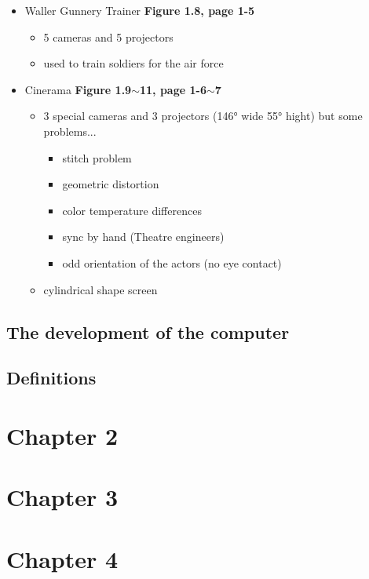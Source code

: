 \documentclass[12pt]{article}
\begin{document}
\begin{itemize}
\begin{itemize}
		\end{itemize}
	\item Waller Gunnery Trainer  \textbf{Figure 1.8, page 1-5}
		\begin{itemize}
			\item 5 cameras and 5 projectors
			\item used to train soldiers for the air force
		\end{itemize}
	\item Cinerama \textbf{Figure 1.9$\sim$11, page 1-6$\sim$7}
		\begin{itemize}
			\item 3 special cameras and 3 projectors (146\si{\degree} wide 55\si{\degree} hight) but some problems...
				\begin{itemize}
					\item stitch problem
					\item geometric distortion
					\item color temperature differences
					\item sync by hand (Theatre engineers)
					\item odd orientation of the actors (no eye contact)
				\end{itemize}
			\item cylindrical shape screen
		\end{itemize}
\end{itemize}

\subsection{The development of the computer}


\subsection{Definitions}


\section{Chapter 2}

\section{Chapter 3}

\section{Chapter 4}
\end{document}
